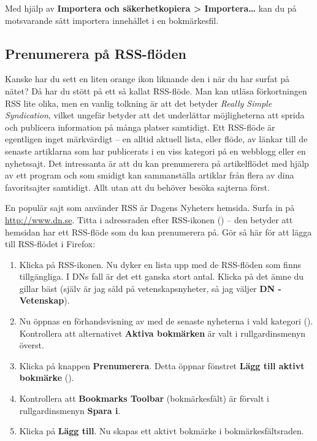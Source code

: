 \documentclass[a4paper,final]{memoir} %
\begin{document}
Med hjälp av \textbf{Importera och säkerhetkopiera \textgreater{} Importera\ldots{}} kan du på motsvarande sätt importera innehållet i en bokmärkesfil.


\subsection{Prenumerera på RSS-flöden}


Kanske har du sett en liten orange ikon liknande den i  när du har surfat på nätet? Då har du stött på ett så kallat RSS-flöde. Man kan utläsa förkortningen RSS lite olika, men en vanlig tolkning är att det betyder \textit{Really Simple Syndication}, vilket ungefär betyder att det underlättar möjligheterna att sprida och publicera information på många platser samtidigt. Ett RSS-flöde är egentligen inget märkvärdigt -- en alltid aktuell lista, eller flöde, av länkar till de senaste artiklarna som har publicerats i en viss kategori på en webblogg eller en nyhetssajt. Det intressanta är att du kan prenumerera på artikelflödet med hjälp av ett program och som smidigt kan sammanställa artiklar från flera av dina favoritsajter samtidigt. Allt utan att du behöver besöka sajterna först. 


En populär sajt som använder RSS är Dagens Nyheters hemsida. Surfa in på \url{http://www.dn.se}. Titta i adressraden efter RSS-ikonen () -- den betyder att hemsidan har ett RSS-flöde som du kan prenumerera på. Gör så här för att lägga till RSS-flödet i Firefox:

\begin{enumerate}

\item Klicka på RSS-ikonen. Nu dyker en lista upp med de RSS-flöden som finns tillgängliga. I DNs fall är det ett ganska stort antal. Klicka på det ämne du gillar bäst (själv är jag såld på vetenskapsnyheter, så jag väljer \textbf{DN - Vetenskap}). 
\item Nu öppnas en förhandsvisning av med de senaste nyheterna i vald kategori (). Kontrollera att alternativet \textbf{Aktiva bokmärken} är valt i rullgardinsmenyn överst.
\item Klicka på knappen \textbf{Prenumerera}. Detta öppnar fönstret \textbf{Lägg till aktivt bokmärke} ().
\item Kontrollera att \textbf{Bookmarks Toolbar} (bokmärkesfält) är förvalt i rullgardinsmenyn \textbf{Spara i}.
\item Klicka på \textbf{Lägg till}. Nu skapas ett aktivt bokmärke i bokmärkesfältsraden.

\end{enumerate}
\end{document}
